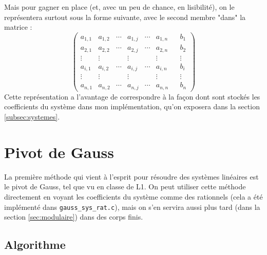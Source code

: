 \documentclass[french]{article}
\begin{document}
Mais pour gagner en place (et, avec un peu de chance, en lisibilité), on le représentera surtout sous la forme suivante, avec le second membre "dans" la matrice :
\begin{equation*}
	\begin{pmatrix}
		a_{1,1} & a_{1,2} & \cdots & a_{1,j} & \cdots & a_{1,n}&&b_1\\
		a_{2,1} & a_{2,2} & \cdots & a_{2,j} & \cdots & a_{2,n}&&b_2\\
		\vdots  & \vdots  & & \vdots & & \vdots&&\vdots\\
		a_{i,1} & a_{i,2} & \cdots & a_{i,j} & \cdots & a_{i,n}&&b_i\\
		\vdots  & \vdots  &  & \vdots & &\vdots&&\vdots\\
		a_{n,1} & a_{n,2} & \cdots & a_{n,j} & \cdots & a_{n,n}&&b_n
	\end{pmatrix}
\end{equation*}
Cette représentation a l'avantage de correspondre à la façon dont sont stockés les coefficients du système dans mon implémentation, qu'on exposera dans la section \ref{subsec:systemes}.
\section{Pivot de Gauss} \label{sec:gauss}
La première méthode qui vient à l'esprit pour résoudre des systèmes linéaires est le pivot de Gauss, tel que vu en classe de L1. On peut utiliser cette méthode directement en voyant les coefficients du système comme des rationnels (cela a été implémenté dans {\tt gauss\_sys\_rat.c}), mais on s'en servira aussi plus tard (dans la section \ref{sec:modulaire}) dans des corps finis.
\subsection{Algorithme}
\end{document}
